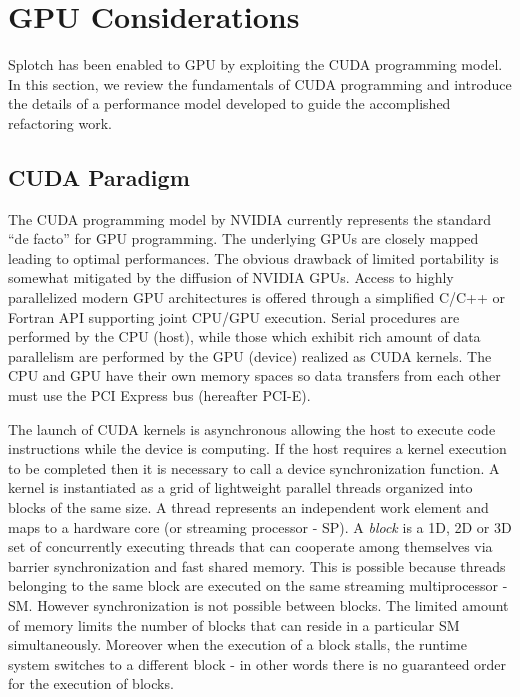\documentclass[1p]{elsarticle}
\begin{document}

\section{GPU Considerations}
\label{sec:gpu-code}

Splotch has been enabled to GPU by exploiting the CUDA programming model. In this section, we review the fundamentals of CUDA programming and introduce the details of a performance model developed to guide the accomplished refactoring work.  

\subsection{CUDA Paradigm} 
\label{sec:cuda}

The CUDA programming model \cite{cudaurl} by NVIDIA currently represents the standard ``de facto'' for GPU programming. The underlying GPUs are closely mapped leading to optimal performances. The obvious drawback of limited portability is somewhat mitigated by the diffusion of NVIDIA GPUs. Access to highly parallelized modern GPU architectures is offered through a simplified C/C++ or Fortran API supporting joint CPU/GPU execution. Serial procedures are performed by the CPU (host), while those which exhibit rich amount of data parallelism are performed by the GPU (device) realized as CUDA kernels. The CPU and GPU have their own memory spaces so data transfers from each other must use the PCI Express bus (hereafter PCI-E). 

The launch of CUDA kernels is asynchronous allowing the host to execute code instructions while the device is computing. If the host requires a kernel execution to be completed then it is necessary to call a device synchronization function. A kernel is instantiated as a grid of lightweight parallel threads organized into blocks of the same size. A thread represents an independent work element and maps to a hardware core (or streaming processor - SP). A {\em block} is a 1D, 2D or 3D set of concurrently executing threads that can cooperate among themselves via barrier synchronization and fast shared memory. This is possible because threads belonging to the same block are executed on the same streaming multiprocessor - SM. However synchronization is not possible between blocks. The limited amount of memory limits the number of  blocks that can reside in a particular SM simultaneously. Moreover when the execution of a block stalls, the runtime system switches to a different block - in other words there is no guaranteed order for the execution of blocks.
\end{document}
